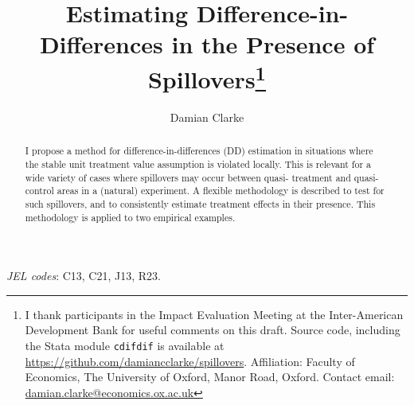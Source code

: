 \documentclass{article}
\title{Estimating Difference-in-Differences in the Presence of Spillovers\footnote{
I thank participants in the Impact Evaluation Meeting at the Inter-American 
Development Bank for useful comments on this draft. Source code, including the
Stata module \texttt{cdifdif} is available at 
\href{https://github.com/damiancclarke/spillovers}{https://github.com/damiancclarke/spillovers}.  
Affiliation: Faculty of Economics, The University of Oxford, Manor Road, 
Oxford. Contact email: \href{mailto:damian.clarke@economics.ox.ac.uk}{damian.clarke@economics.ox.ac.uk}}}
\author{Damian Clarke}
\begin{document}
\maketitle


\begin{abstract}
I propose a method for difference-in-differences (DD) estimation in situations 
where the stable unit treatment value assumption is violated locally. This is
relevant for a wide variety of cases where spillovers may occur between quasi-%
treatment and quasi-control areas in a (natural) experiment. A flexible 
methodology is described to test for such spillovers, and to consistently 
estimate treatment effects in their presence. This methodology is applied to two 
empirical examples.
\end{abstract}
\hspace{8mm} \emph{JEL codes}: C13, C21, J13, R23. \\
\end{document}
